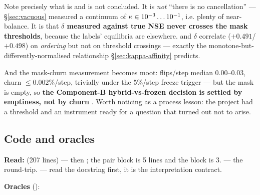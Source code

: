 \begin{warn}
Note precisely what is and is not concluded. It is \emph{not} ``there is no
cancellation'' --- \S\ref{sec:vacuous} measured a continuum of
$\kappa \in 10^{-3}\ldots10^{-1}$, i.e. plenty of near-balance. It is that
\textbf{$\delta$ measured against true NSE never crosses the mask thresholds},
because the labels' equilibria are elsewhere. \kap{} and $\delta$ correlate
($+0.491$/$+0.498$) on \emph{ordering} but not on threshold crossings --- exactly
the monotone-but-differently-normalised relationship
\S\ref{sec:kappa-affinity} predicts.
\end{warn}

And the mask-churn measurement becomes moot: flips/step median 0.00--0.03, churn
$\le 0.002\%$/step, trivially under the 5\%/step freeze trigger --- but the mask
is empty, so \textbf{the Component-B hybrid-vs-frozen decision is settled by
emptiness, not by churn} . Worth noticing as a process
lesson: the project had a threshold and an instrument ready for a question that
turned out not to arise.

\subsection{Code and oracles}
\label{sec:codes8}

\textbf{Read:}  (207 lines) --- 
then ; the pair block is 5 lines and the \kap{} block is
3.  --- the round-trip.  ---
read the docstring first, it is the interpretation contract.

\textbf{Oracles} ():

